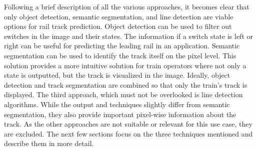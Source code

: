 \clearpage

\noindent Following a brief description of all the various approaches, it becomes clear that only object detection, semantic segmentation, and line detection are viable options for rail track prediction.
Object detection can be used to filter out switches in the image and their states.
The information if a switch state is left or right can be useful for predicting the leading rail in an application.
Semantic segmentation can be used to identify the track itself on the pixel level.
This solution provides a more intuitive solution for train operators where not only a state is outputted, but the track is visualized in the image.
Ideally, object detection and track segmentation are combined so that only the train's track is displayed.
The third approach, which must not be overlooked is line detection algorithms.
While the output and techniques slightly differ from semantic segmentation, they also provide important pixel-wise information about the track.
As the other approaches are not suitable or relevant for this use case, they are excluded. The next few sections focus on the three techniques mentioned and describe them in more detail.